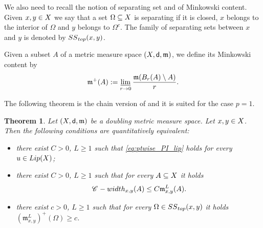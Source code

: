 \documentclass[12pt]{amsart}
\newcommand{\sfd}{{\sf d}}
\newcommand{\limi}{\varliminf}
\newcommand{\X}{{\rm X}}
\newcommand{\Lip}{{\rm Lip}}
\newcommand{\mm}{\mathfrak m}
\newcommand{\width}{{\rm width}}
\renewcommand{\SS}{{\rm SS}}
\newtheorem{theorem}{Theorem}[section]
\theoremstyle{definition}
\newcommand{\Chain}[1]{\mathscr{C}^{#1}}
\begin{document}
  
%
We also need to recall the notion of separating set and of Minkowski content. Given $x,y\in \X$ we say that a set $\Omega \subseteq \X$ is separating if it is closed, $x$ belongs to the interior of $\Omega$ and $y$ belongs to $\Omega^c$. The family of separating sets between $x$ and $y$ is denoted by $\SS_{\textup{top}}(x,y)$.

Given a subset $A$ of a metric measure space $(\X,\sfd,\mm)$, we define its Minkowski content by
$$\mm^+(A) := \limi_{r\to 0} \frac{\mm(B_r(A)\setminus A)}{r}.$$
  
The following theorem is the chain version of \cite[Theorem 1.4]{CaputoCavallucci2024II} and it is suited for the case $p=1$.
%
\begin{theorem}
\label{theo:1-PI_equiv_BMC}
    Let $(\X,\sfd,\mm)$ be a doubling metric measure space. Let $x,y \in \X$. Then the following conditions are quantitatively equivalent:
    \begin{itemize}
        \item[(i)] there exist $C >0$, $L \ge 1$ such that \eqref{eq:ptwise_PI_lip} holds for every $u \in \Lip(\X)$;
        \item[(ii)] there exist $C>0$, $L \ge 1$ such that for every $A \subseteq \X$ it holds 
    \begin{equation}
        \Chain{}\textup{-}\width_{x,y}(A) \le C \mm_{x,y}^L(A).
    \end{equation}
        \item[(iii)] there exist $c >0$, $L \ge 1$ such that for every $\Omega \in \SS_{\textup{top}}(x,y)$ it holds $(\mm_{x,y}^L)^+(\Omega) \ge c$.
    \end{itemize}
\end{theorem}
%
\end{document}
